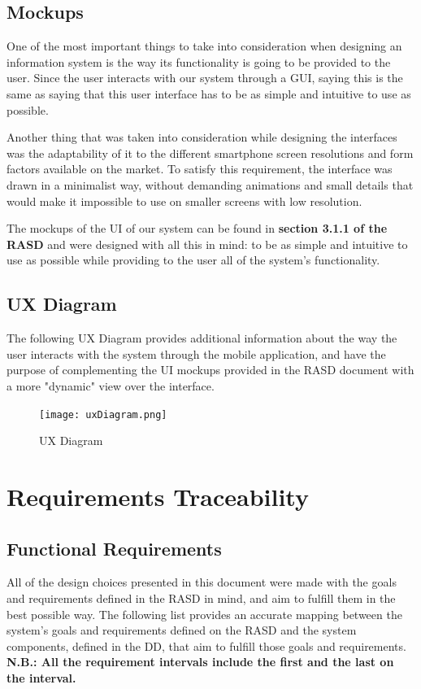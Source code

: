 \documentclass[12pt]{article}
\begin{document}
\subsection{Mockups}
One of the most important things to take into consideration when designing an information system is the way its functionality is going to be provided to the user. Since the user interacts with our system through a GUI, saying this is the same as saying that this user interface has to be as simple and intuitive to use as possible.

Another thing that was taken into consideration while designing the interfaces was the adaptability of it to the different smartphone screen resolutions and form factors available on the market. To satisfy this requirement, the interface was drawn in a minimalist way, without demanding animations and small details that would make it impossible to use on smaller screens with low resolution.

The mockups of the UI of our system can be found in \textbf{section 3.1.1 of the RASD} and were designed with all this in mind: to be as simple and intuitive to use as possible while providing to the user all of the system's functionality.
\subsection{UX Diagram}
The following UX Diagram provides additional information about the way the user interacts with the system through the mobile application, and have the purpose of complementing the UI mockups provided in the RASD document with a more "dynamic" view over the interface.

\begin{figure}[H]
    \centering
    \texttt{[image: uxDiagram.png]}
    \caption{UX Diagram}
    \label{fig:uxDiagram}
\end{figure}

\section{Requirements Traceability}
\subsection{Functional Requirements}
All of the design choices presented in this document were made with the goals and requirements defined in the RASD in mind, and aim to fulfill them in the best possible way. The following list provides an accurate mapping between the system's goals and requirements defined on the RASD and the system components, defined in the DD, that aim to fulfill those goals and requirements.\\
\textbf{N.B.: All the requirement intervals include the first and the last on the interval.}
\end{document}
